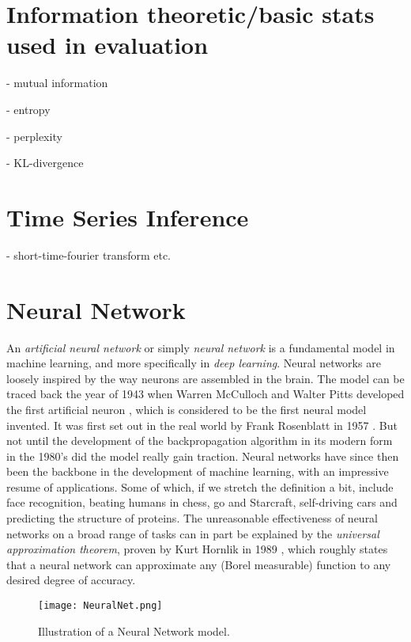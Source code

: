 \documentclass[../../thesis.tex]{subfiles}
\begin{document}



\section{Information theoretic/basic stats used in evaluation}

- mutual information

- entropy

- perplexity

- KL-divergence

\section{Time Series Inference}
- short-time-fourier transform etc.

\section{Neural Network}
An \textit{artificial neural network} or simply \textit{neural network} is a fundamental model in machine learning, and more specifically in \textit{deep learning}. Neural networks are loosely inspired by the way neurons are assembled in the brain. The model can be traced back the year of 1943 when Warren McCulloch and Walter Pitts developed the first artificial neuron \cite{MCCULLOCH199099}, which is considered to be the first neural model invented. It was first set out in the real world by Frank Rosenblatt in 1957 \cite{rosenblatt1957perceptron}. But not until the development of the backpropagation algorithm in its modern form in the 1980's did the model really gain traction. Neural networks have since then been the backbone in the development of machine learning, with an impressive resume of applications. Some of which, if we stretch the definition a bit, include face recognition, beating humans in chess, go and Starcraft, self-driving cars and predicting the structure of proteins. The unreasonable effectiveness of neural networks on a broad range of tasks can in part be explained by the \textit{universal approximation theorem}, proven by Kurt Hornlik in 1989 \cite{HORNIK1989359}, which roughly states that a neural network can approximate any (Borel measurable) function to any desired degree of accuracy. 

\begin{figure}
    \texttt{[image: NeuralNet.png]}
    \centering 
    \caption{Illustration of a Neural Network model.}
    \label{fig:NeuralNet}
\end{figure}
\end{document}

